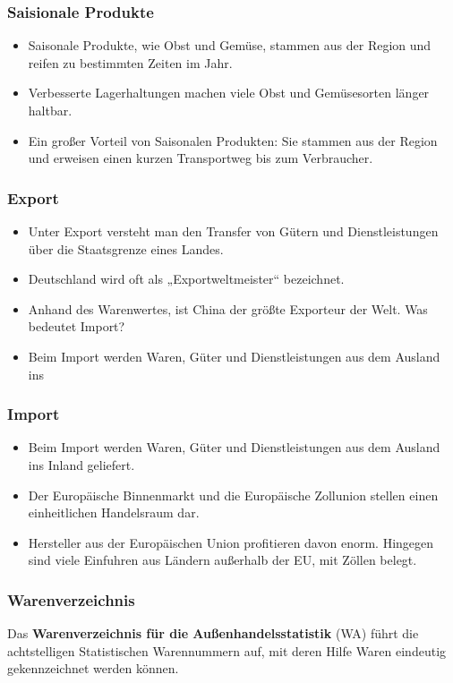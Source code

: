 \documentclass{beamer}
\begin{document}
\begin{frame}
\frametitle{Saisionale Produkte}
  \begin{itemize}
    \item Saisonale Produkte, wie Obst und Gemüse, stammen
      aus der Region und reifen zu bestimmten Zeiten im Jahr.
    \item  Verbesserte Lagerhaltungen machen viele Obst und
      Gemüsesorten länger haltbar.
    \item  Ein großer Vorteil von Saisonalen Produkten: Sie
      stammen aus der Region und erweisen einen kurzen
      Transportweg bis zum Verbraucher.
  \end{itemize}
\end{frame}

\begin{frame}
\frametitle{Export}
  \begin{itemize}
    \item
Unter Export versteht man den Transfer von Gütern und Dienstleistungen über
die Staatsgrenze eines Landes.
    \item
Deutschland wird oft als „Exportweltmeister“ bezeichnet.
    \item
Anhand des Warenwertes, ist China der größte Exporteur der Welt.
Was bedeutet Import?
    \item
Beim Import werden Waren, Güter und Dienstleistungen aus dem Ausland ins
  \end{itemize}
\end{frame}

\begin{frame}
\frametitle{Import}
  \begin{itemize}
    \item Beim Import werden Waren, Güter und Dienstleistungen aus dem Ausland ins
      Inland geliefert.
    \item Der Europäische Binnenmarkt und die Europäische Zollunion stellen einen
      einheitlichen Handelsraum dar.
    \item Hersteller aus der Europäischen Union profitieren davon enorm. Hingegen sind
      viele Einfuhren aus Ländern außerhalb der EU, mit Zöllen belegt.
  \end{itemize}
\end{frame}

\begin{frame}
\frametitle{Warenverzeichnis}
Das \textbf{Warenverzeichnis für die Außenhandelsstatistik} (WA) führt die
achtstelligen Statistischen Warennummern auf, mit deren Hilfe Waren
eindeutig gekennzeichnet werden können.
\end{frame}
\end{document}
